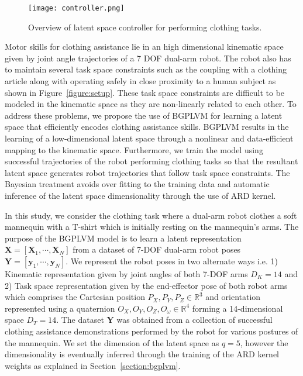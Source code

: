 \documentclass[a4paper]{article}
\begin{document}
\begin{figure}[t]
  \centering
  \texttt{[image: controller.png]}
  \caption{Overview of latent space controller for performing clothing tasks.}
  \label{figure:realtime}
\end{figure}

Motor skills for clothing assistance lie in an high dimensional kinematic space given by joint angle trajectories of a 7 DOF dual-arm robot. The robot also has to maintain several task space constraints such as the coupling with a clothing article along with operating safely in close proximity to a human subject as shown in Figure~\ref{figure:setup}. These task space constraints are difficult to be modeled in the kinematic space as they are non-linearly related to each other. To address these problems, we propose the use of BGPLVM for learning a latent space that efficiently encodes clothing assistance skills. BGPLVM results in the learning of a low-dimensional latent space through a nonlinear and data-efficient mapping to the kinematic space. Furthermore, we train the model using successful trajectories of the robot performing clothing tasks so that the resultant latent space generates robot trajectories that follow task space constraints. The Bayesian treatment avoids over fitting to the training data and automatic inference of the latent space dimensionality through the use of ARD kernel.

In this study, we consider the clothing task where a dual-arm robot clothes a soft mannequin with a T-shirt which is initially resting on the mannequin's arms. The purpose of the BGPLVM model is to learn a latent representation $\mathbf{X} = [\mathbf{X}_1, \cdots, \mathbf{X}_N]$ from a dataset of 7-DOF dual-arm robot poses $\mathbf{Y} = [\mathbf{y}_1, \cdots, \mathbf{y}_N]$. We represent the robot poses in two alternate ways i.e. 1) Kinematic representation given by joint angles of both 7-DOF arms $D_K = 14$ and 2) Task space representation given by the end-effector pose of both robot arms which comprises the Cartesian position ${P_X,P_Y,P_Z} \in \mathbb{R}^3$ and orientation represented using a quaternion ${O_X,O_Y,O_Z,O_{\omega}} \in \mathbb{R}^4$ forming a 14-dimensional space $D_T = 14$. The dataset $\mathbf{Y}$ was obtained from a collection of successful clothing assistance demonstrations performed by the robot for various postures of the mannequin. We set the dimension of the latent space as $q = 5$, however the dimensionality is eventually inferred through the training of the ARD kernel weights as explained in Section~\ref{section:bgplvm}.
\end{document}
